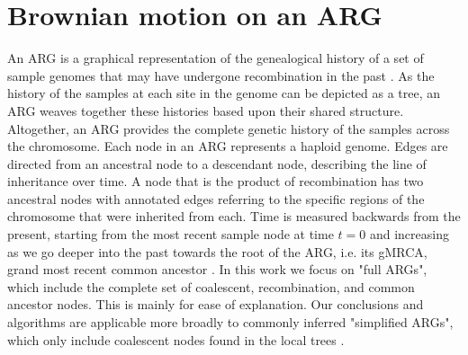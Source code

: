 \section{Brownian motion on an ARG} %

%


An ARG is a graphical representation of the genealogical history of a set of sample genomes that may have undergone recombination in the past \citep{Wong2023}. As the history of the samples at each site in the genome can be depicted as a tree, an ARG weaves together these histories based upon their shared structure. Altogether, an ARG provides the complete genetic history of the samples across the chromosome. Each node in an ARG represents a haploid genome. Edges are directed from an ancestral node to a descendant node, describing the line of inheritance over time. A node that is the product of recombination has two ancestral nodes with annotated edges referring to the specific regions of the chromosome that were inherited from each. Time is measured backwards from the present, starting from the most recent sample node at time $t=0$ and increasing as we go deeper into the past towards the root of the ARG, i.e. its gMRCA, grand most recent common ancestor \citep{Wong2023}. In this work we focus on "full ARGs", which include the complete set of coalescent, recombination, and common ancestor nodes. This is mainly for ease of explanation. %
Our conclusions and algorithms are applicable more broadly to commonly inferred "simplified ARGs", which only include coalescent nodes found in the local trees \citep{Wong2023,Baumdicker2022,shipilina2023origin,lewanski2023era}.


